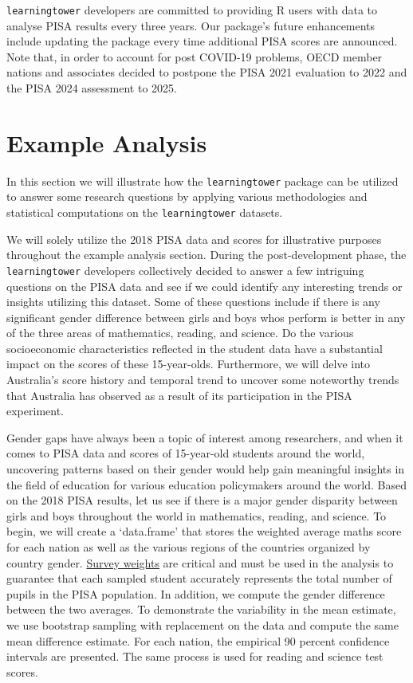 \texttt{learningtower} developers are committed to providing R users
with data to analyse PISA results every three years. Our package's
future enhancements include updating the package every time additional
PISA scores are announced. Note that, in order to account for post
COVID-19 problems, OECD member nations and associates decided to
postpone the PISA 2021 evaluation to 2022 and the PISA 2024 assessment
to 2025.

\hypertarget{example-analysis}{%
\section{Example Analysis}\label{example-analysis}}

In this section we will illustrate how the \texttt{learningtower}
package can be utilized to answer some research questions by applying
various methodologies and statistical computations on the
\texttt{learningtower} datasets.

We will solely utilize the 2018 PISA data and scores for illustrative
purposes throughout the example analysis section. During the
post-development phase, the \texttt{learningtower} developers
collectively decided to answer a few intriguing questions on the PISA
data and see if we could identify any interesting trends or insights
utilizing this dataset. Some of these questions include if there is any
significant gender difference between girls and boys whos perform is
better in any of the three areas of mathematics, reading, and science.
Do the various socioeconomic characteristics reflected in the student
data have a substantial impact on the scores of these 15-year-olds.
Furthermore, we will delve into Australia's score history and temporal
trend to uncover some noteworthy trends that Australia has observed as a
result of its participation in the PISA experiment.

Gender gaps have always been a topic of interest among researchers, and
when it comes to PISA data and scores of 15-year-old students around the
world, uncovering patterns based on their gender would help gain
meaningful insights in the field of education for various education
policymakers around the world. Based on the 2018 PISA results, let us
see if there is a major gender disparity between girls and boys
throughout the world in mathematics, reading, and science. To begin, we
will create a `data.frame' that stores the weighted average maths score
for each nation as well as the various regions of the countries
organized by country gender.
\href{https://www.oecd.org/pisa/data/2015-technical-report/PISA-2015-Technical-Report-Chapter-8-Survey-Weighting.pdf}{Survey
weights} are critical and must be used in the analysis to guarantee that
each sampled student accurately represents the total number of pupils in
the PISA population. In addition, we compute the gender difference
between the two averages. To demonstrate the variability in the mean
estimate, we use bootstrap sampling with replacement on the data and
compute the same mean difference estimate. For each nation, the
empirical 90 percent confidence intervals are presented. The same
process is used for reading and science test scores.

